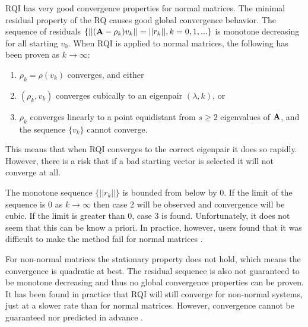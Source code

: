 RQI has very good convergence properties for normal matrices. The minimal residual property of the RQ causes good global convergence behavior. The sequence of residuals $\{ ||(\mathbf{A} - \rho_{k})v_{k}|| = ||r_{k}||, k = 0, 1, ... \}$ is monotone decreasing for all starting $v_{0}$. When RQI is applied to normal matrices, the following has been proven as $k \to \infty$:
%
\begin{enumerate}
 \item $\rho_{k} = \rho(v_{k})$ converges, and either
 \item $(\rho_{k}, v_{k})$ converges cubically to an eigenpair $(\lambda, k)$, or
 \item $\rho_{k}$ converges linearly to a point equidistant from $s \ge 2$ eigenvalues of $\mathbf{A}$, and the sequence $\{v_{k}\}$ cannot converge. 
\end{enumerate}
%
This means that when RQI converges to the correct eigenpair it does so rapidly. However, there is a risk that if a bad starting vector is selected it will not converge at all. 

The monotone sequence $\{||r_{k}||\}$ is bounded from below by 0. If the limit of the sequence is 0 as $k \to \infty$ then case 2 will be observed and convergence will be cubic. If the limit is greater than 0, case 3 is found. Unfortunately, it does not seem that this can be know a priori. In practice, however, users found that it was difficult to make the method fail for normal matrices \cite{Parlett1974}. 

For non-normal matrices the stationary property does not hold, which means the convergence is quadratic at best. The residual sequence is also not guaranteed to be monotone decreasing and thus no global convergence properties can be proven. It has been found in practice that RQI will still converge for non-normal systems, just at a slower rate than for normal matrices. However, convergence cannot be guaranteed nor predicted in advance \cite{Parlett1974}. 


